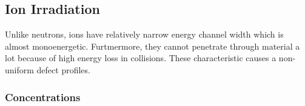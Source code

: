 \documentclass[a4paper]{article}
\begin{document}
  \subsection{Ion Irradiation} \hspace{10pt}
  Unlike neutrons, ions have relatively narrow energy channel width which is almost monoenergetic. Furtmermore, they cannot penetrate through material a lot because of high energy loss in collisions. These characteristic causes a non-uniform defect profiles.
    \subsubsection{Concentrations}
      \begin{figure}[h!]  %
        \centering
        \qquad

\end{figure}
\end{document}
